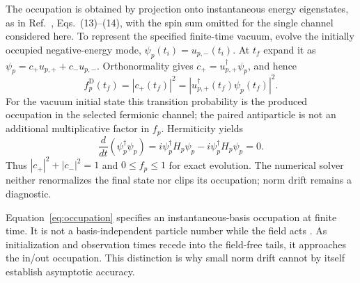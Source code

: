 \documentclass[11pt,a4paper]{article}
\begin{document}
The occupation is obtained by projection onto instantaneous energy eigenstates, as in Ref.~\cite{LiGong2021}, Eqs.~(13)--(14), with the spin sum omitted for the single channel considered here. To represent the specified finite-time vacuum, evolve the initially occupied negative-energy mode, $\psi_p(t_i)=u_{p,-}(t_i)$. At $t_f$ expand it as $\psi_p=c_+u_{p,+}+c_-u_{p,-}$. Orthonormality gives $c_+=u_{p,+}^\dagger\psi_p$, and hence
\begin{equation}
 f_p^{\mathrm D}(t_f)=|c_+(t_f)|^2
 =\left|u_{p,+}^\dagger(t_f)\psi_p(t_f)\right|^2.
 \label{eq:occupation}
\end{equation}
For the vacuum initial state this transition probability is the produced occupation in the selected fermionic channel; the paired antiparticle is not an additional multiplicative factor in $f_p$. Hermiticity yields
\begin{equation}
 \frac{d}{dt}(\psi_p^\dagger\psi_p)
 =i\psi_p^\dagger H_p\psi_p-i\psi_p^\dagger H_p\psi_p=0.
\end{equation}
Thus $|c_+|^2+|c_-|^2=1$ and $0\leq f_p\leq1$ for exact evolution. The numerical solver neither renormalizes the final state nor clips its occupation; norm drift remains a diagnostic.

Equation~\eqref{eq:occupation} specifies an instantaneous-basis occupation at finite time. It is not a basis-independent particle number while the field acts \cite{Dabrowski2016}. As initialization and observation times recede into the field-free tails, it approaches the in/out occupation. This distinction is why small norm drift cannot by itself establish asymptotic accuracy.
\end{document}
